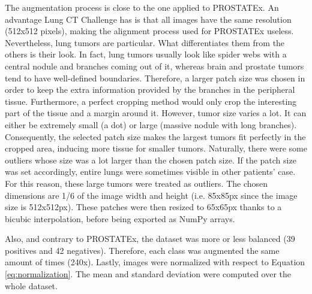 The augmentation process is close to the one applied to PROSTATEx. An advantage Lung CT Challenge has is that all images have the same resolution (512x512 pixels), making the alignment process used for PROSTATEx useless. Nevertheless, lung tumors are particular. What differentiates them from the others is their look. In fact, lung tumors usually look like spider webs with a central nodule and branches coming out of it, whereas brain and prostate tumors tend to have well-defined boundaries. Therefore, a larger patch size was chosen in order to keep the extra information provided by the branches in the peripheral tissue. Furthermore, a perfect cropping method would only crop the interesting part of the tissue and a margin around it. However, tumor size varies a lot. It can either be extremely small (a dot) or large (massive nodule with long branches). Consequently, the selected patch size makes the largest tumors fit perfectly in the cropped area, inducing more tissue for smaller tumors. Naturally, there were some outliers whose size was a lot larger than the chosen patch size. If the patch size was set accordingly, entire lungs were sometimes visible in other patients' case. For this reason, these large tumors were treated as outliers. The chosen dimensions are 1/6 of the image width and height (i.e. 85x85px since the image size is 512x512px). These patches were then resized to 65x65px thanks to a bicubic interpolation, before being exported as NumPy arrays.

Also, and contrary to PROSTATEx, the dataset was more or less balanced (39 positives and 42 negatives). Therefore, each class was augmented the same amount of times (240x). Lastly, images were normalized with respect to Equation \ref{eq:normalization}. The mean and standard deviation were computed over the whole dataset. 

